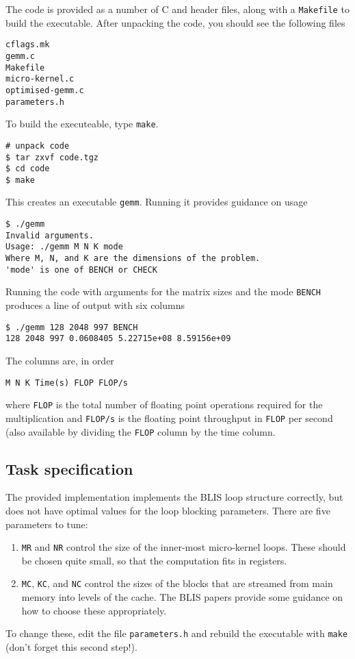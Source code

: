 \documentclass[a4paper]{article}
\begin{document}
The code is provided as a number of C and header files, along with a
\texttt{Makefile} to build the executable. After unpacking the code,
you should see the following files
\begin{verbatim}
cflags.mk
gemm.c
Makefile
micro-kernel.c
optimised-gemm.c
parameters.h
\end{verbatim}

To build the executeable, type \texttt{make}.
\begin{verbatim}
# unpack code
$ tar zxvf code.tgz
$ cd code
$ make
\end{verbatim}
This creates an executable \texttt{gemm}. Running it provides guidance
on usage
\begin{verbatim}
$ ./gemm
Invalid arguments.
Usage: ./gemm M N K mode
Where M, N, and K are the dimensions of the problem.
'mode' is one of BENCH or CHECK
\end{verbatim}
Running the code with arguments for the matrix sizes and the mode
\texttt{BENCH} produces a line of output with six columns
\begin{verbatim}
$ ./gemm 128 2048 997 BENCH
128 2048 997 0.0608405 5.22715e+08 8.59156e+09
\end{verbatim}
The columns are, in order
\begin{verbatim}
M N K Time(s) FLOP FLOP/s
\end{verbatim}
where \texttt{FLOP} is the total number of floating point operations
required for the multiplication and \texttt{FLOP/s} is the floating
point throughput in \texttt{FLOP} per second (also available by
dividing the \texttt{FLOP} column by the time column.

\subsection{Task specification}
\label{sec:task}
The provided implementation implements the BLIS loop structure
correctly, but does not have optimal values for the loop blocking
parameters. There are five parameters to tune:
\begin{enumerate}
\item \texttt{MR} and \texttt{NR} control the size of the inner-most
  micro-kernel loops. These should be chosen quite small, so that the
  computation fits in registers.
\item \texttt{MC}, \texttt{KC}, and \texttt{NC} control the sizes of
  the blocks that are streamed from main memory into levels of the
  cache. The BLIS papers provide some guidance on how to choose these
  appropriately.
\end{enumerate}
To change these, edit the file \texttt{parameters.h} and rebuild the
executable with \texttt{make} (don't forget this second step!).
\end{document}
